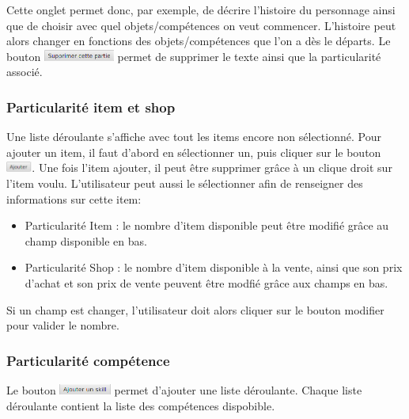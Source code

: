 			Cette onglet permet donc, par exemple, de décrire l'histoire du personnage ainsi que de choisir avec quel objets/compétences on veut commencer. L'histoire peut alors changer en fonctions des objets/compétences que l'on a dès le départs.
			Le bouton \includegraphics[height=10pt]{img/preludeSupprimerBouton.png} permet de supprimer le texte ainsi que la particularité associé.

			\subsubsection{Particularité item et shop} \label{subsubsection:Item/Shop}
				Une liste déroulante s'affiche avec tout les items encore non sélectionné. Pour ajouter un item, il faut d'abord en sélectionner un, puis cliquer sur le bouton \includegraphics[height=10pt]{img/preludeAjouterBouton.png}. Une fois l'item ajouter, il peut être supprimer grâce à un clique droit sur l'item voulu.
				L'utilisateur peut aussi le sélectionner afin de renseigner des informations sur cette item:
				\begin{itemize}
					\item Particularité Item : le nombre d'item disponible peut être modifié grâce au champ disponible en bas.
					\item Particularité Shop : le nombre d'item disponible à la vente, ainsi que son prix d'achat et son prix de vente peuvent être modfié grâce aux champs en bas.
				\end{itemize}
				Si un champ est changer, l'utilisateur doit alors cliquer sur le bouton modifier pour valider le nombre.

			\subsubsection{Particularité compétence}
				Le bouton \includegraphics[height=10pt]{img/preludeAjouterSkillBouton.png} permet d'ajouter une liste déroulante. Chaque liste déroulante contient la liste des compétences dispobible.

